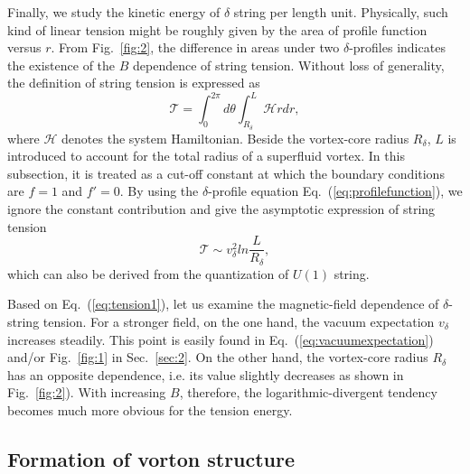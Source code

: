 \documentclass[prd, showpacs,nofootinbib,amsmath,amssymb]{revtex4}
\begin{document}
Finally, we study the kinetic energy of $\delta$ string per length unit. Physically, such kind of
linear tension might be roughly given by the area of profile function versus $r$. From Fig.~\ref{fig:2},
the difference in areas under two $\delta$-profiles indicates the existence of the $B$ dependence of
string tension.
Without loss of generality, the definition of string tension is expressed as
\begin{equation}
\mathcal{T} = \int^{2\pi}_{0}d\theta \int^L_{R_\delta}
\mathcal{H} rdr
\label{eq:tension},
\end{equation}
where $\mathcal{H}$ denotes the system Hamiltonian.
Beside the vortex-core radius $R_\delta$, $L$ is introduced to account for the total radius of a
superfluid vortex. In this subsection, it is treated as a cut-off constant at which the boundary
conditions are $f =1$ and $f' =0$.
By using the $\delta$-profile equation Eq.~(\ref{eq:profilefunction}), we ignore the constant
contribution and give the asymptotic expression of string tension
\begin{equation}
  \label{eq:tension1}
  \mathcal{T} \sim v_\delta^2 ln\frac{L}{R_\delta},
\end{equation}
which can also be derived from the quantization of $U(1)$ string.

Based on Eq.~(\ref{eq:tension1}), let us examine the magnetic-field dependence of $\delta$-string tension.
For a stronger field, on the one hand, the vacuum expectation $v_\delta$ increases steadily.
This point is easily found in Eq.~(\ref{eq:vacuumexpectation}) and/or Fig.~\ref{fig:1} in Sec.~\ref{sec:2}.
On the other hand, the vortex-core radius $R_\delta$ has an opposite dependence, i.e. its value slightly
decreases as shown in Fig.~\ref{fig:2}). With increasing $B$, therefore, the logarithmic-divergent
tendency becomes much more obvious for the tension energy. 


\subsection{Formation of vorton structure }
\label{sssec:5}
\end{document}

